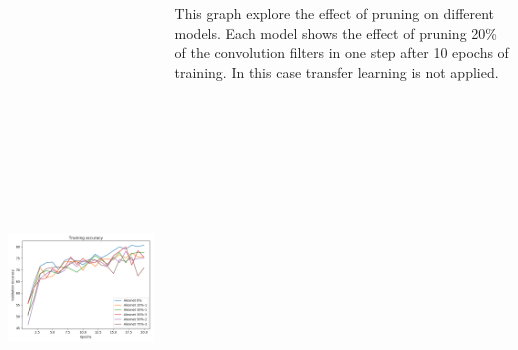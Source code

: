 \documentclass[25pt, a0paper,
               colspace=15mm, subcolspace=0mm,
               blockverticalspace=17mm,
               landscape]{tikzposter} %
\begin{document}
\begin{columns}
{\begin{center}
	\includegraphics[width=15cm, height=15cm]{figures/various_models}
\end{center}

This graph explore the effect of pruning on different models. Each model shows the effect of pruning 20\% of the convolution filters in one step after 10 epochs of training. In this case transfer learning is not applied.
}
\end{columns}
\end{document}
